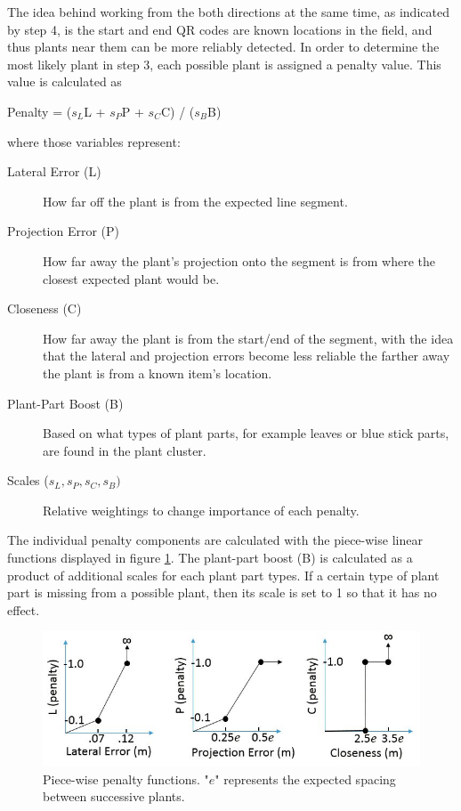 The idea behind working from the both directions at the same time, as indicated by step 4, is the start and end QR codes are known locations in the field, and thus plants near them can be more reliably detected.  In order to determine the most likely plant in step 3, each possible plant is assigned a penalty value.  This value is calculated as

\begin{center}
Penalty = ($s_L$L + $s_P$P + $s_C$C) / ($s_B$B)
\end{center}
where those variables represent:

\begin{description}
\item[Lateral Error (L)] How far off the plant is from the expected line segment.
\item[Projection Error (P)] How far away the plant's projection onto the segment is from where the closest expected plant would be.
\item[Closeness (C)] How far away the plant is from the start/end of the segment, with the idea that the lateral and projection errors become less reliable the farther away the plant is from a known item's location.
\item[Plant-Part Boost (B)] Based on what types of plant parts, for example leaves or blue stick parts, are found in the plant cluster.
\item[Scales ($s_L,s_P,s_C,s_B)$] Relative weightings to change importance of each penalty.
\end{description}

The individual penalty components are calculated with the piece-wise linear functions displayed in figure \ref{figure:piecewise_penalties}.  The plant-part boost (B) is calculated as a product of additional scales for each plant part types.  If a certain type of plant part is missing from a possible plant, then its scale is set to 1 so that it has no effect.  

\begin{figure}
	\centering
    \includegraphics[width=5.5in]{figures/piece_wise.jpg}
    \caption[Group segments]{Piece-wise penalty functions. "$e$" represents the expected spacing between successive plants.}
    \label{figure:piecewise_penalties}
\end{figure}

